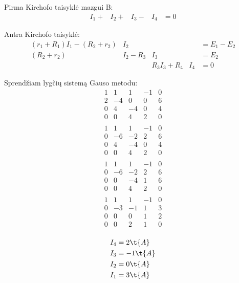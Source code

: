 \begin{exmp}

  Pirma Kirchofo taisyklė mazgui B:
  \begin{align*}
    I_{1} + &I_{2} + &I_{3} - &I_{4} &= 0
  \end{align*}

  Antra Kirchofo taisyklė:
  \begin{align*}
    (r_{1} + R_{1}) I_{1} - (R_{2} + r_{2}) &I_{2} && &= E_{1} - E_{2} \\
    (R_{2} + r_{2}) &I_{2} - R_{3}&I_{3} & &= E_{2} \\
    &&R_{3}I_{3} + R_{4}&I_{4} &= 0
  \end{align*}

  Sprendžiam lygčių sistemą Gauso metodu:
  \begin{align*}
    1 & 1 & 1 & -1 & 0 \\
    2 & -4 & 0 & 0 & 6 \\
    0 & 4 & -4 & 0 & 4 \\
    0 & 0 & 4 & 2 & 0 \\
  \end{align*}
  \begin{align*}
    1 & 1 & 1 & -1 & 0 \\
    0 & -6 & -2 & 2 & 6 \\
    0 & 4 & -4 & 0 & 4 \\
    0 & 0 & 4 & 2 & 0 \\
  \end{align*}
  \begin{align*}
    1 & 1 & 1 & -1 & 0 \\
    0 & -6 & -2 & 2 & 6 \\
    0 & 0 & -4 & 1 & 6 \\
    0 & 0 & 4 & 2 & 0 \\
  \end{align*}
  \begin{align*}
    1 & 1 & 1 & -1 & 0 \\
    0 & -3 & -1 & 1 & 3 \\
    0 & 0 & 0 & 1 & 2 \\
    0 & 0 & 2 & 1 & 0 \\
  \end{align*}

  \begin{align*}
    I_{4} &= 2 \t{A} \\
    I_{3} &= -1 \t{A} \\
    I_{2} &= 0 \t{A} \\
    I_{1} &= 3 \t{A}
  \end{align*}
\end{exmp}

